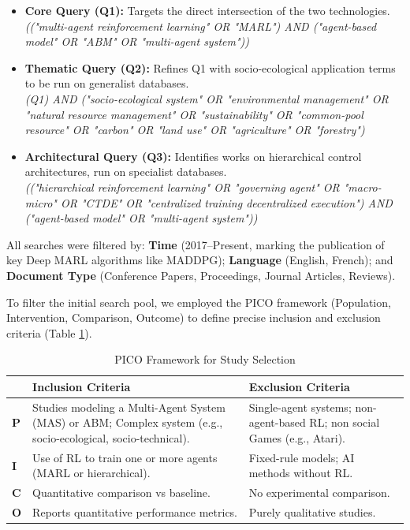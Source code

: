 \documentclass[conference]{IEEEtran}
\begin{document}
\begin{itemize}
    \item \textbf{Core Query (Q1):} Targets the direct intersection of the two technologies. \\
    \textit{(("multi-agent reinforcement learning" OR "MARL") AND ("agent-based model" OR "ABM" OR "multi-agent system"))}

    \item \textbf{Thematic Query (Q2):} Refines Q1 with socio-ecological application terms to be run on generalist databases. \\
    \textit{(Q1) AND ("socio-ecological system" OR "environmental management" OR "natural resource management" OR "sustainability" OR "common-pool resource" OR "carbon" OR "land use" OR "agriculture" OR "forestry")}

    \item \textbf{Architectural Query (Q3):} Identifies works on hierarchical control architectures, run on specialist databases. \\
    \textit{(("hierarchical reinforcement learning" OR "governing agent" OR "macro-micro" OR "CTDE" OR "centralized training decentralized execution") AND ("agent-based model" OR "multi-agent system"))}
\end{itemize}

All searches were filtered by: \textbf{Time} (2017–Present, marking the publication of key Deep MARL algorithms like MADDPG); \textbf{Language} (English, French); and \textbf{Document Type} (Conference Papers, Proceedings, Journal Articles, Reviews).

To filter the initial search pool, we employed the PICO framework (Population, Intervention, Comparison, Outcome) to define precise inclusion and exclusion criteria (Table \ref{tab:pico}).

\begin{table}[htbp]
\caption{PICO Framework for Study Selection}
\centering
\begin{tabularx}{\linewidth}{|p{0.15cm}|X|X|}
\hline
 & \textbf{Inclusion Criteria} & \textbf{Exclusion Criteria} \\ \hline
\textbf{P} & Studies modeling a Multi-Agent System (MAS) or ABM; Complex system (e.g., socio-ecological, socio-technical). & Single-agent systems; non-agent-based RL; non social Games (e.g., Atari). \\ \hline
\textbf{I} & Use of RL to train one or more agents (MARL or hierarchical). & Fixed-rule models; AI methods without RL. \\ \hline
\textbf{C} & Quantitative comparison vs baseline. & No experimental comparison. \\ \hline
\textbf{O} & Reports quantitative performance metrics. & Purely qualitative studies. \\ \hline
\end{tabularx}
\label{tab:pico}
\end{table}
\end{document}
